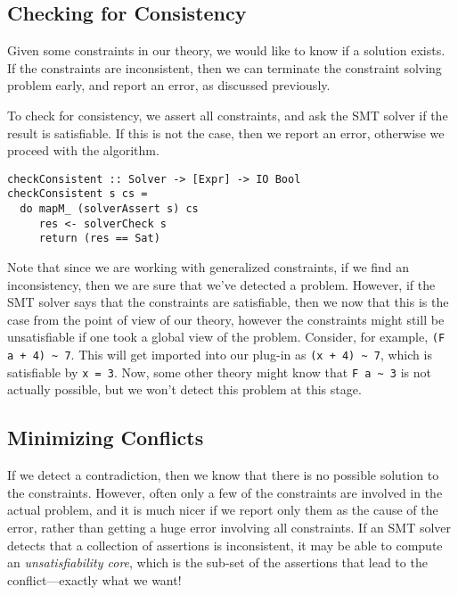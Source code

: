\documentclass{sigplanconf}
\begin{document}
\subsection{Checking for Consistency}

Given some constraints in our theory, we would like to know if a
solution exists.  If the constraints are inconsistent, then we can
terminate the constraint solving problem early, and report an error,
as discussed previously.

To check for consistency, we assert all constraints, and ask the SMT
solver if the result is satisfiable.  If this is not the case, then
we report an error, otherwise we proceed with the algorithm.
\begin{Verbatim}
checkConsistent :: Solver -> [Expr] -> IO Bool
checkConsistent s cs =
  do mapM_ (solverAssert s) cs
     res <- solverCheck s
     return (res == Sat)
\end{Verbatim}

Note that since we are working with generalized constraints, if we find an
inconsistency, then we are sure that we've detected a problem.  However,
if the SMT solver says that the constraints are satisfiable, then
we now that this is the case from the point of view of our theory,
however the constraints might still be unsatisfiable if one took a global
view of the problem.  Consider, for example, \Verb"(F a + 4) ~ 7".
This will get imported into our plug-in as \Verb"(x + 4) ~ 7", which is
satisfiable by \Verb"x = 3".  Now, some other theory might know that
\Verb"F a ~ 3" is not actually possible, but we won't detect this problem
at this stage.

\subsection{Minimizing Conflicts}
If we detect a contradiction, then
we know that there is no possible solution to the constraints.  However,
often only a few of the constraints are involved in the actual problem,
and it is much nicer if we report only them as the cause of the error,
rather than getting a huge error involving all constraints.  If an SMT
solver detects that a collection of assertions is inconsistent, it may
be able to compute an {\em unsatisfiability core}, which is the sub-set
of the assertions that lead to the conflict---exactly what we want!
\end{document}
